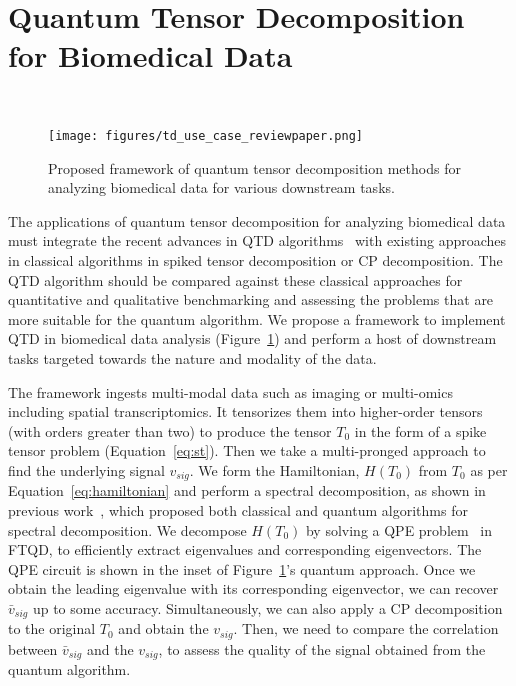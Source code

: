 \section{Quantum Tensor Decomposition for Biomedical Data}~\label{sec:td_usecase} 
\begin{figure}
    \centering
    \texttt{[image: figures/td\_use\_case\_reviewpaper.png]}
    \caption{Proposed framework of quantum tensor decomposition methods for analyzing biomedical data for various downstream tasks.}
    \label{fig:qtd_framework}
\end{figure}
The applications of quantum tensor decomposition for analyzing biomedical data must integrate the recent advances in QTD algorithms~\cite{hastings2020classical,zhou2024statistical} with existing approaches in classical algorithms in spiked tensor decomposition or CP decomposition. The QTD algorithm should be compared against these classical approaches for quantitative and qualitative benchmarking and assessing the problems that are more suitable for the quantum algorithm. We propose a framework to implement QTD in biomedical data analysis (Figure~\ref{fig:qtd_framework}) and perform a host of downstream tasks targeted towards the nature and modality of the data.  

The framework ingests multi-modal data such as imaging or multi-omics including spatial transcriptomics. It tensorizes them into higher-order tensors (with orders greater than two) to produce the tensor $T_0$ in the form of a spike tensor problem (Equation~\ref{eq:st}). Then we take a multi-pronged approach to find the underlying signal $v_{sig}$. We form the Hamiltonian, $H(T_0)$ from $T_0$ as per Equation~\ref{eq:hamiltonian} and perform a spectral decomposition, as shown in previous work~\cite{hastings2020classical}, which proposed both classical and quantum algorithms for spectral decomposition. We decompose $H(T_0)$ by solving a QPE problem~\cite{kitaev1995quantum} in FTQD, to efficiently extract eigenvalues and corresponding eigenvectors. The QPE circuit is shown in the inset of Figure~\ref{fig:qtd_framework}'s quantum approach. Once we obtain the leading eigenvalue with its corresponding eigenvector, we can recover $\bar{v}_{sig}$ up to some accuracy. Simultaneously, we can also apply a CP decomposition to the original $T_0$ and obtain the $v_{sig}$. Then, we need to compare the correlation between $\bar{v}_{sig}$ and the $v_{sig}$, to assess the quality of the signal obtained from the quantum algorithm. 

